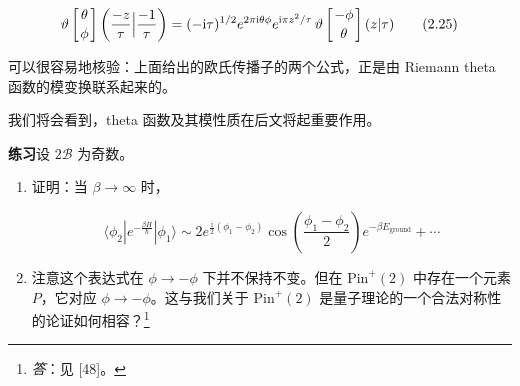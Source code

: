 \begin{equation}
  \vartheta\left[\genfrac{}{}{0pt}{}{\theta}{\phi}\right]\left(\frac{-z}{\tau}\Big|\frac{-1}{\tau}\right)=(-\mathrm{i}\tau)^{1/2}e^{2\pi\mathrm{i}\theta\phi}e^{\mathrm{i}\pi z^{2}/\tau}\,\vartheta\left[\genfrac{}{}{0pt}{}{-\phi}{\theta}\right](z|\tau)
  \tag{2.25}
  \label{eq:2.25}
\end{equation}


可以很容易地核验：上面给出的欧氏传播子的两个公式，正是由 Riemann theta 函数的模变换联系起来的。

我们将会看到，theta 函数及其模性质在后文将起重要作用。

\medskip\noindent\textbf{练习}\quad 设 $2\mathcal{B}$ 为奇数。

\begin{enumerate}[label=\alph*.)]
  \item 证明：当 $\beta\to\infty$ 时，

\begin{equation}
  \langle\phi_2|e^{-\frac{\beta H}{\hbar}}|\phi_1\rangle\sim 2e^{\frac{\mathrm{i}}{2}(\phi_1-\phi_2)}\cos\left(\frac{\phi_1-\phi_2}{2}\right)e^{-\beta E_{\mathrm{ground}}}+\cdots
  \tag{2.26}
  \label{eq:2.26}
\end{equation}

  \item 注意这个表达式在 $\phi\to-\phi$ 下并不保持不变。但在 $\mathrm{Pin}^{+}(2)$ 中存在一个元素 $P$，它对应 $\phi\to-\phi$。这与我们关于 $\mathrm{Pin}^{+}(2)$ 是量子理论的一个合法对称性的论证如何相容？\footnote{\emph{答}：见 [48]。}
\end{enumerate}

